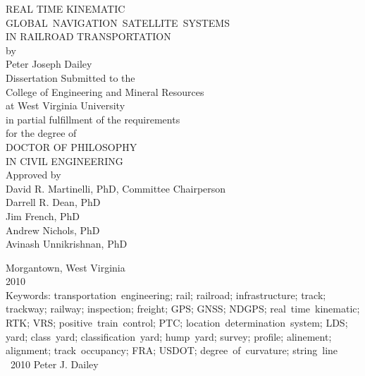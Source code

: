 \thispagestyle{empty}
\begin{center}
\OnehalfSpacing
\vspace{20pt}
REAL TIME KINEMATIC\\
\mbox{GLOBAL NAVIGATION SATELLITE SYSTEMS}\\
IN RAILROAD TRANSPORTATION\\
\SingleSpacing 
	by\\Peter Joseph Dailey\\
\vspace{20pt}
	Dissertation Submitted to the\\
	College of Engineering and Mineral Resources\\
	at West Virginia University\\
	in partial fulfillment of the requirements\\
	for the degree of\\
\DoubleSpacing
	DOCTOR OF PHILOSOPHY\\
	IN CIVIL ENGINEERING\\
\vspace{60pt}
\SingleSpacing 
Approved by\\
David R. Martinelli, PhD, Committee Chairperson\\
Darrell R. Dean, PhD\\
Jim French, PhD\\
Andrew Nichols, PhD\\
Avinash Unnikrishnan, PhD\\
\vspace{60pt}

{Morgantown, West Virginia}\\
2010\\
\vspace{40pt}
Keywords: transportation~engineering; rail; railroad; infrastructure; track; trackway; railway; inspection; freight; GPS; GNSS; NDGPS; real~time~kinematic; RTK; VRS; positive~train~control; PTC; location~determination~system; LDS; yard; class~yard; classification~yard; hump~yard; survey; profile; alinement; alignment; track~occupancy; FRA; USDOT; degree~of~curvature; string~line \\
\vspace{10pt}
\textcopyright~2010 Peter J. Dailey
\end{center}
